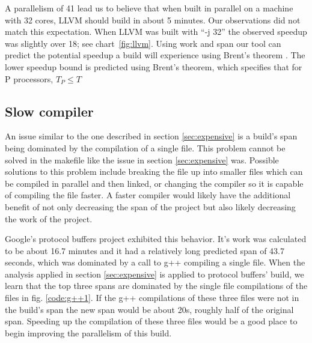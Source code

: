 \documentclass[sigconf,10pt,review,authorversion]{acmart}\settopmatter{printfolios=true,printccs=false,printacmref=false}
\begin{document}
A parallelism of 41 lead us to believe that when built in parallel on a machine with 32 cores,
LLVM should build in about 5 minutes.  Our observations did not match this expectation.  When LLVM was
built with ``-j 32'' the observed speedup was slightly over 18; see chart~\ref{fig:llvm}.  Using work and
span our tool can predict the potential speedup a build will experience using Brent's theorem
\cite{}.  The lower speedup bound is predicted using Brent's theorem, which specifies that for
P processors, \begin{math} T_P \leq T \end{math}



\subsection{Slow compiler}
\label{sec:compiler}

An issue similar to the one described in section \ref{sec:expensive} is a build's
span being dominated by the compilation of a single file.  This problem cannot be
solved in the makefile like the issue in section \ref{sec:expensive} was.
Possible solutions to this problem include
breaking the file up into smaller files which can be compiled in parallel and then
linked, or changing the compiler so it is capable of compiling the file faster.
A faster compiler would likely have the additional benefit of not only decreasing the span
of the project but also likely decreasing the work of the project.

Google's protocol buffers project \cite{protobufs3.6.1} exhibited this behavior.  It's work was calculated
to be about 16.7 minutes and it had a relatively
long predicted span of 43.7 seconds, which was dominated by a call to g++ compiling
a single file.  When the analysis applied in section \ref{sec:expensive} is applied
to protocol buffers' build, we learn that the top three spans are dominated by the
single file compilations of the files in fig. \ref{code:g++1}.  If the g++ compilations
of these three files were not in the build's span the new span would be about 20s,
roughly half of the original span.  Speeding up the compilation of these three files
would be a good place to begin improving the parallelism of this build.
\end{document}
